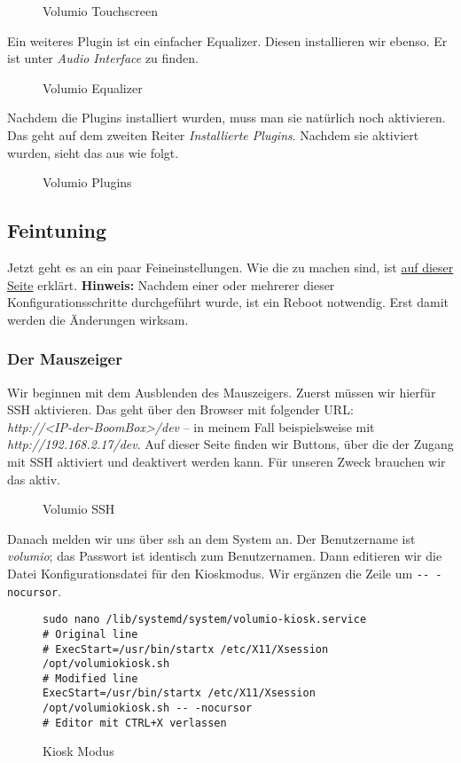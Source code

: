 \documentclass[12pt,a4paper]{article}
\newcommand{\capla}[1]{\caption{#1}\label{fig:#1}}
\newcommand{\code}[1]{\texttt{#1}}
\newcommand{\jpaimg}[2]{\begin{figure}[H]\centering\fbox{\texttt{[image: \#1]}}\capla{#2}\end{figure}}
\begin{document}
\jpaimg{./../images/vol-touch.png}{Volumio Touchscreen}

Ein weiteres Plugin ist ein einfacher Equalizer. Diesen installieren wir ebenso. Er ist unter \textit{Audio Interface} zu finden.

\jpaimg{./../images/vol-equal.png}{Volumio Equalizer}

Nachdem die Plugins installiert wurden, muss man sie natürlich noch aktivieren. Das geht auf dem zweiten Reiter \textit{Installierte Plugins}. Nachdem sie
aktiviert wurden, sieht das aus wie folgt.

\jpaimg{./../images/vol-plug-active.png}{Volumio Plugins}

\subsection{Feintuning}\label{subsec:Feintuning}
Jetzt geht es an ein paar Feineinstellungen. Wie die zu machen sind, ist \href{https://volumio.org/forum/guide-for-setting-touchscreen-backlight-control-t11425.html}{auf dieser Seite}
erklärt. \textbf{Hinweis:} Nachdem einer oder mehrerer dieser Konfigurationsschritte durchgeführt wurde, ist ein Reboot notwendig. Erst damit werden die
Änderungen wirksam.

\subsubsection{Der Mauszeiger}\label{subsubsec:SSH}
Wir beginnen mit dem Ausblenden des Mauszeigers. Zuerst müssen wir hierfür SSH aktivieren. Das geht über den Browser mit folgender URL:\@ \\
\textit{http://<IP-der-BoomBox>/dev} -- in meinem Fall beispielsweise mit \\ \textit{http://192.168.2.17/dev}. Auf dieser Seite finden wir Buttons, über die der
Zugang mit SSH aktiviert und deaktivert werden kann. Für unseren Zweck brauchen wir das aktiv.

\jpaimg{./../images/vol-dev.png}{Volumio SSH}

Danach melden wir uns über ssh an dem System an. Der Benutzername ist \textit{volumio}; das Passwort ist identisch zum Benutzernamen. Dann editieren wir die
Datei Konfigurationsdatei für den Kioskmodus. Wir ergänzen die Zeile um \code{-{}- -nocursor}.

\begin{figure}[H]
\begin{lstlisting}
sudo nano /lib/systemd/system/volumio-kiosk.service
# Original line
# ExecStart=/usr/bin/startx /etc/X11/Xsession /opt/volumiokiosk.sh
# Modified line
ExecStart=/usr/bin/startx /etc/X11/Xsession /opt/volumiokiosk.sh -- -nocursor
# Editor mit CTRL+X verlassen
\end{lstlisting}
\capla{Kiosk Modus}
\end{figure}
\end{document}
